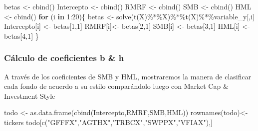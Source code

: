 \documentclass[
  12pt,
]{article}
\newenvironment{Shaded}{\begin{snugshade}}{\end{snugshade}}
\newcommand{\ControlFlowTok}[1]{\textcolor[rgb]{0.13,0.29,0.53}{\textbf{#1}}}
\newcommand{\DecValTok}[1]{\textcolor[rgb]{0.00,0.00,0.81}{#1}}
\newcommand{\FunctionTok}[1]{\textcolor[rgb]{0.00,0.00,0.00}{#1}}
\newcommand{\NormalTok}[1]{#1}
\newcommand{\OtherTok}[1]{\textcolor[rgb]{0.56,0.35,0.01}{#1}}
\newcommand{\SpecialCharTok}[1]{\textcolor[rgb]{0.00,0.00,0.00}{#1}}
\newcommand{\StringTok}[1]{\textcolor[rgb]{0.31,0.60,0.02}{#1}}
\begin{document}
\begin{Shaded}
\begin{Highlighting}[]
\NormalTok{betas }\OtherTok{\textless{}{-}} \FunctionTok{cbind}\NormalTok{()}
\NormalTok{Intercepto }\OtherTok{\textless{}{-}} \FunctionTok{cbind}\NormalTok{()}
\NormalTok{RMRF }\OtherTok{\textless{}{-}} \FunctionTok{cbind}\NormalTok{()}
\NormalTok{SMB }\OtherTok{\textless{}{-}} \FunctionTok{cbind}\NormalTok{()}
\NormalTok{HML }\OtherTok{\textless{}{-}} \FunctionTok{cbind}\NormalTok{()}
\ControlFlowTok{for}\NormalTok{ (i }\ControlFlowTok{in} \DecValTok{1}\SpecialCharTok{:}\DecValTok{20}\NormalTok{)\{}
\NormalTok{  betas }\OtherTok{\textless{}{-}} \FunctionTok{solve}\NormalTok{(}\FunctionTok{t}\NormalTok{(X)}\SpecialCharTok{\%*\%}\NormalTok{X)}\SpecialCharTok{\%*\%}\FunctionTok{t}\NormalTok{(X)}\SpecialCharTok{\%*\%}\NormalTok{variable\_y[,i]}
\NormalTok{  Intercepto[i] }\OtherTok{\textless{}{-}}\NormalTok{ betas[}\DecValTok{1}\NormalTok{,}\DecValTok{1}\NormalTok{]}
\NormalTok{  RMRF[i]}\OtherTok{\textless{}{-}}\NormalTok{ betas[}\DecValTok{2}\NormalTok{,}\DecValTok{1}\NormalTok{]}
\NormalTok{  SMB[i] }\OtherTok{\textless{}{-}}\NormalTok{ betas[}\DecValTok{3}\NormalTok{,}\DecValTok{1}\NormalTok{]}
\NormalTok{  HML[i] }\OtherTok{\textless{}{-}}\NormalTok{ betas[}\DecValTok{4}\NormalTok{,}\DecValTok{1}\NormalTok{]}
\NormalTok{\}}
\end{Highlighting}
\end{Shaded}

\hypertarget{cuxe1lculo-de-coeficientes-b-h}{%
\subsubsection{Cálculo de coeficientes b \&
h}\label{cuxe1lculo-de-coeficientes-b-h}}

A través de los coeficientes de SMB y HML, mostraremos la manera de
clasificar cada fondo de acuerdo a su estilo comparándolo luego con
Market Cap \& Investment Style

\begin{Shaded}
\begin{Highlighting}[]
\NormalTok{todo }\OtherTok{\textless{}{-}} \FunctionTok{as.data.frame}\NormalTok{(}\FunctionTok{cbind}\NormalTok{(Intercepto,RMRF,SMB,HML))}
\FunctionTok{rownames}\NormalTok{(todo)}\OtherTok{\textless{}{-}}\NormalTok{tickers}
\NormalTok{todo[}\FunctionTok{c}\NormalTok{(}\StringTok{"GFFFX"}\NormalTok{,}\StringTok{"AGTHX"}\NormalTok{,}\StringTok{"TRBCX"}\NormalTok{,}\StringTok{"SWPPX"}\NormalTok{,}\StringTok{"VFIAX"}\NormalTok{),]}
\end{Highlighting}
\end{Shaded}
\end{document}
